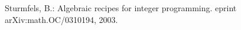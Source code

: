 \documentclass[12pt]{article}
\theoremstyle{definition}
\begin{document}
\begin{comment}
\subsection{Acknowledgments}

We are truly grateful to several people for many suggestions and
interesting conversations that led to an improvement of our
software. In the dearest hope that we do not forget someone in the
following collection of names, our thanks goes to (in alphabetical
order): Maya Ahmed, Jes\'us De Loera, Serkan Hosten, Diana Maclagan,
Kristen Nairn, R\"udiger Schultz, Bernd Sturmfels, Seth Sullivant,
Rekha Thomas, Ruriko Yoshida. 


\end{comment}



\begin{thebibliography}{99}
Sturmfels, B.: Algebraic recipes for integer programming. 
eprint arXiv:math.OC/0310194, 2003.
\end{thebibliography}	
\end{document}
